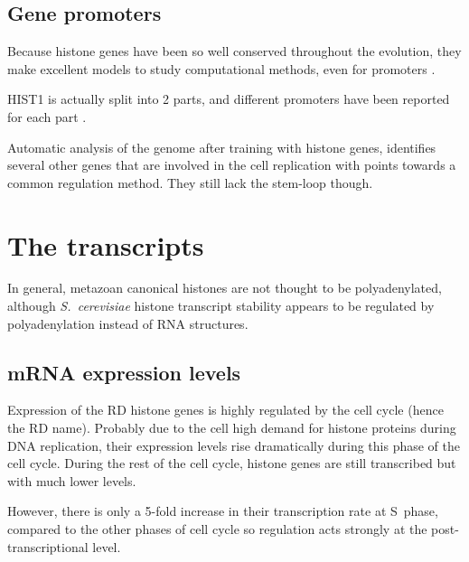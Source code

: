 \documentclass[10pt,a4paper,twocolumn,article]{memoir}
\newcommand{\addref}[1][]{\todo[color=red!40,size=\tiny]{Add reference: #1}}
\begin{document}
    \subsection{Gene promoters}

      Because histone genes have been so well conserved throughout the evolution, they make
      excellent models to study computational methods, even for promoters
      \citep{histone-promoter-modeling}.

      HIST1 is actually split into 2 parts, and different promoters have been reported for each
      part \citep{HISTOne-different-transcripts}.

      Automatic analysis of the genome after training with histone genes, identifies
      several other genes that are involved in the cell replication with points
      towards a common regulation method. They still lack the stem-loop though.

  \section{The transcripts}

    In general, metazoan canonical histones
    are not thought to be polyadenylated, although \textit{S.\ cerevisiae} histone transcript stability
    appears to be regulated by polyadenylation instead of RNA structures.

    \subsection{mRNA expression levels}
      Expression of the RD histone genes is highly regulated by the cell cycle (hence the RD name). Probably due
      to the cell high demand for histone proteins during DNA replication, their expression levels rise dramatically
      during this phase of the cell cycle. During the rest of the cell cycle, histone genes are still transcribed
      but with much lower levels.

      However, there is only a 5-fold increase in their transcription rate at S~phase, compared to the other phases
      of cell cycle so regulation acts strongly at the post-transcriptional level\addref.
\end{document}
